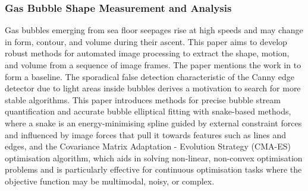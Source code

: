 \subsubsection{Gas Bubble Shape Measurement and Analysis \cite{zelenkaGasBubbleShape2014}}
Gas bubbles emerging from sea floor seepages rise at high speeds and may change in form, contour, and volume during their ascent. This paper aims to develop robust methods for automated image processing to extract the shape, motion, and volume from a sequence of image frames. The paper mentions the work in \cite{thomanekAutomatedGasBubble2010} to form a baseline. The sporadical false detection characteristic of the Canny edge detector due to light areas inside bubbles derives a motivation to search for more stable algorithms. This paper introduces methods for precise bubble stream quantification and accurate bubble elliptical fitting with snake-based methods, where a snake is an energy-minimising spline guided by external constraint forces and influenced by image forces that pull it towards features such as lines and edges, and the Covariance Matrix Adaptation - Evolution Strategy (CMA-ES) optimisation algorithm, which aids in solving non-linear, non-convex optimisation problems and is particularly effective for continuous optimisation tasks where the objective function may be multimodal, noisy, or complex.

